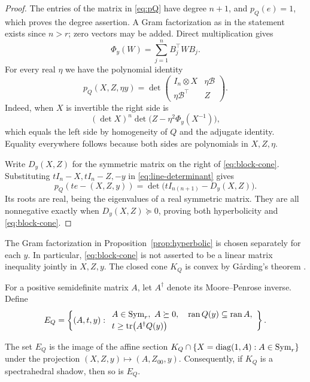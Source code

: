 \begin{proof}
The entries of the matrix in \eqref{eq:pQ} have degree $n+1$, and
$p_Q(e)=1$, which proves the degree assertion. A Gram factorization
as in the statement exists since $n>r$; zero vectors may be added.
Direct multiplication gives
\[
 \Phi_y(W)=\sum_{j=1}^n B_j^\top W B_j.
\]
For every real $\eta$ we have the polynomial identity
\begin{equation}\label{eq:line-determinant}
 p_Q(X,Z,\eta y)=
 \det\begin{pmatrix}I_n\otimes X&\eta\mathcal B\\
                     \eta\mathcal B^\top&Z\end{pmatrix}.
\end{equation}
Indeed, when $X$ is invertible the right side is
\[
 (\det X)^n
 \det\bigl(Z-\eta^2\Phi_y(X^{-1})\bigr),
\]
which equals the left side by homogeneity of $Q$ and the adjugate
identity. Equality everywhere follows because both sides are
polynomials in $X,Z,\eta$.

Write $D_y(X,Z)$ for the symmetric matrix on the right of
\eqref{eq:block-cone}. Substituting $tI_n-X,tI_n-Z,-y$ in
\eqref{eq:line-determinant} gives
\[
 p_Q(te-(X,Z,y))=\det\bigl(tI_{n(n+1)}-D_y(X,Z)\bigr).
\]
Its roots are real, being the eigenvalues of a real symmetric matrix.
They are all nonnegative exactly when $D_y(X,Z)\succeq0$, proving both
hyperbolicity and \eqref{eq:block-cone}.
\end{proof}

The Gram factorization in Proposition~\ref{prop:hyperbolic} is chosen
separately for each $y$. In particular, \eqref{eq:block-cone} is not
asserted to be a linear matrix inequality jointly in $X,Z,y$.
The closed cone $K_Q$ is convex by G\aa rding's theorem
\cite{Garding1959}.

For a positive semidefinite matrix $A$, let $A^\dagger$ denote its
Moore--Penrose inverse. Define
\begin{equation}\label{eq:EQ}
 E_Q=\left\{(A,t,y):
 \begin{array}{l}
 A\in\operatorname{Sym}_r,\ A\succeq0,\quad \operatorname{ran} Q(y)\subseteq\operatorname{ran} A,\\[2pt]
 t\geq\operatorname{tr}\bigl(A^\dagger Q(y)\bigr)
 \end{array}\right\}.
\end{equation}

\begin{proposition}\label{prop:epigraph}
The set $E_Q$ is the image of the affine section
$K_Q\cap\{X=\operatorname{diag}(1,A):A\in\operatorname{Sym}_r\}$ under the projection
$(X,Z,y)\mapsto(A,Z_{00},y)$. Consequently, if $K_Q$ is a
spectrahedral shadow, then so is $E_Q$.
\end{proposition}

